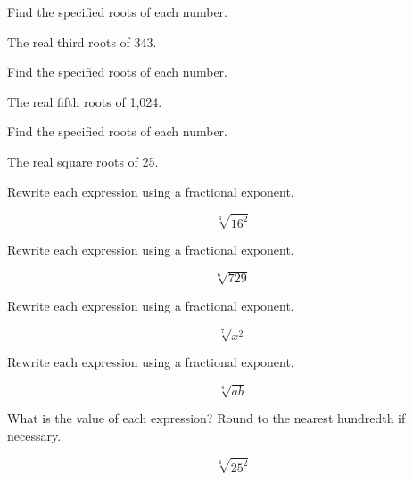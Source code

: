 \documentclass{article}
\newenvironment{practice}[2]{}{}        %
\newcommand{\answer}[1]{}               %
\begin{document}
\begin{practice}{26}{1}
Find the specified roots of each number.

The real third roots of 343.

\answer{7}
\end{practice}

\begin{practice}{27}{1}
Find the specified roots of each number.

The real fifth roots of 1,024.

\answer{4}
\end{practice}

\begin{practice}{28}{1}
Find the specified roots of each number.

The real square roots of 25.

\answer{\(\pm5\)}
\end{practice}

\begin{practice}{29}{1}
Rewrite each expression using a fractional exponent.

\[
\sqrt[4]{16^2}
\]

\answer{\(16^{\frac24}=16^{\frac12}\)}
\end{practice}

\begin{practice}{30}{1}
Rewrite each expression using a fractional exponent.

\[
\sqrt[6]{729}
\]

\answer{\(729^{\frac16}\)}
\end{practice}

\begin{practice}{31}{1}
Rewrite each expression using a fractional exponent.

\[
\sqrt[7]{x^2}
\]

\answer{\(x^{\frac27}\)}
\end{practice}

\begin{practice}{32}{1}
Rewrite each expression using a fractional exponent.

\[
\sqrt[4]{ab}
\]

\answer{\((ab)^{\frac14}\)}
\end{practice}

\begin{practice}{33}{1}
What is the value of each expression? Round to the nearest hundredth if necessary.

\[
\sqrt[4]{25^2}
\]

\answer{5}
\end{practice}
\end{document}
